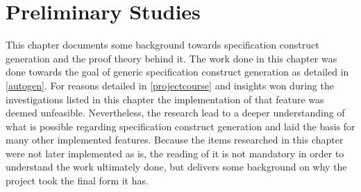 \section{Preliminary Studies}
This chapter documents some background towards specification construct generation and the proof theory behind it. The work done in this chapter was done towards the goal of generic specification construct generation as detailed in \ref{autogen}. For reasons detailed in \ref{projectcourse} and insights won during the investigations listed in this chapter the implementation of that feature was deemed unfeasible. Nevertheless, the research lead to a deeper understanding of what is possible regarding specification construct generation and laid the basis for many other implemented features. Because the items researched in this chapter were not later implemented as is, the reading of it is not mandatory in order to understand the work ultimately done, but delivers some background on why the project took the final form it has.

